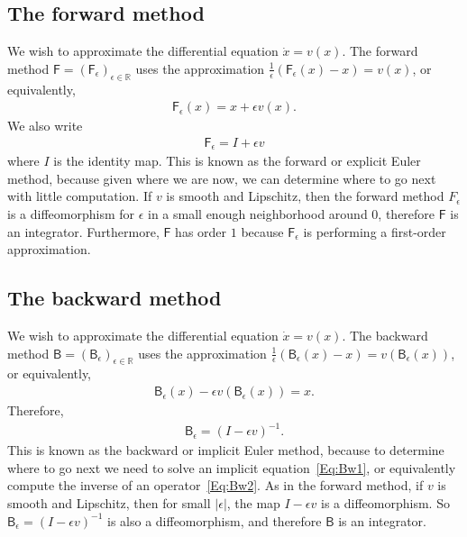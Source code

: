 \documentclass[final,12pt]{colt2018}
\newcommand{\R}{\mathbb{R}}
\newcommand{\F}{\mathsf{F}}
\newcommand{\B}{\mathsf{B}}
\begin{document}
\subsection{The forward method}
\label{Sec:Fwd}
 
We wish to approximate the differential equation $\dot x = v(x)$.
The forward method 
$\F = (\F_\epsilon)_{\epsilon \in \R}$ 
uses the approximation $\frac{1}{\epsilon}(\F_\epsilon(x)-x) = v(x)$, or equivalently,
\begin{align}\label{Eq:Fw1}
\F_\epsilon(x) = x + \epsilon v(x).
\end{align}
We also write
\begin{align}\label{Eq:Fw2}
\F_\epsilon = I + \epsilon v
\end{align}
where $I$ is the identity map.
This is known as the forward or explicit Euler method, because given where we are now, we can determine where to go next with little computation.
If $v$ is smooth and Lipschitz, 
then the forward method 
$F_\epsilon$ is a diffeomorphism for $\epsilon$ in a small enough neighborhood around $0$, therefore $\F$ is an integrator.
Furthermore, $\F$ has order $1$ because $\F_\epsilon$ is performing a first-order approximation.



\subsection{The backward method}

We wish to approximate the differential equation $\dot x = v(x)$.
The backward method $\B = (\B_\epsilon)_{\epsilon \in \R}$ 
uses the approximation $\frac{1}{\epsilon}(\B_\epsilon(x)-x) = v(\B_\epsilon(x))$, or equivalently,
\begin{align}\label{Eq:Bw1}
\B_\epsilon(x) - \epsilon v(\B_\epsilon(x)) = x.
\end{align}
Therefore,
\begin{align}\label{Eq:Bw2}
\B_\epsilon = (I - \epsilon v)^{-1}.
\end{align}
This is known as the backward or implicit Euler method, because to determine where to go next we need to solve an implicit equation~\eqref{Eq:Bw1}, or equivalently compute the inverse of an operator~\eqref{Eq:Bw2}.
As in the forward method, if $v$ is smooth and Lipschitz, then for small $|\epsilon|$, the map $I-\epsilon v$ is a diffeomorphism.
So $\B_\epsilon = (I-\epsilon v)^{-1}$ is also a diffeomorphism, and therefore $\B$ is an integrator.
\end{document}
